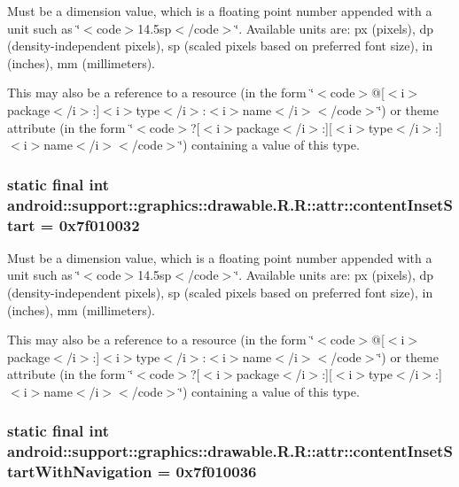 Must be a dimension value, which is a floating point number appended with a unit such as \char`\"{}$<$code$>$14.5sp$<$/code$>$\char`\"{}. Available units are: px (pixels), dp (density-independent pixels), sp (scaled pixels based on preferred font size), in (inches), mm (millimeters). 

This may also be a reference to a resource (in the form \char`\"{}$<$code$>$@\mbox{[}$<$i$>$package$<$/i$>$:\mbox{]}$<$i$>$type$<$/i$>$:$<$i$>$name$<$/i$>$$<$/code$>$\char`\"{}) or theme attribute (in the form \char`\"{}$<$code$>$?\mbox{[}$<$i$>$package$<$/i$>$:\mbox{]}\mbox{[}$<$i$>$type$<$/i$>$:\mbox{]}$<$i$>$name$<$/i$>$$<$/code$>$\char`\"{}) containing a value of this type. \hypertarget{classandroid_1_1support_1_1graphics_1_1drawable_1_1_r_1_1attr_f1266f3eec1e1a2c74543bb9c3bcfa59}{
\subsubsection[{contentInsetStart}]{\setlength{\rightskip}{0pt plus 5cm}static final int android::support::graphics::drawable.R.R::attr::contentInsetStart = 0x7f010032}}
\label{classandroid_1_1support_1_1graphics_1_1drawable_1_1_r_1_1attr_f1266f3eec1e1a2c74543bb9c3bcfa59}


Must be a dimension value, which is a floating point number appended with a unit such as \char`\"{}$<$code$>$14.5sp$<$/code$>$\char`\"{}. Available units are: px (pixels), dp (density-independent pixels), sp (scaled pixels based on preferred font size), in (inches), mm (millimeters). 

This may also be a reference to a resource (in the form \char`\"{}$<$code$>$@\mbox{[}$<$i$>$package$<$/i$>$:\mbox{]}$<$i$>$type$<$/i$>$:$<$i$>$name$<$/i$>$$<$/code$>$\char`\"{}) or theme attribute (in the form \char`\"{}$<$code$>$?\mbox{[}$<$i$>$package$<$/i$>$:\mbox{]}\mbox{[}$<$i$>$type$<$/i$>$:\mbox{]}$<$i$>$name$<$/i$>$$<$/code$>$\char`\"{}) containing a value of this type. \hypertarget{classandroid_1_1support_1_1graphics_1_1drawable_1_1_r_1_1attr_c16ae7d4468d0838176d7559c62c8bb5}{
\subsubsection[{contentInsetStartWithNavigation}]{\setlength{\rightskip}{0pt plus 5cm}static final int android::support::graphics::drawable.R.R::attr::contentInsetStartWithNavigation = 0x7f010036}}
\label{classandroid_1_1support_1_1graphics_1_1drawable_1_1_r_1_1attr_c16ae7d4468d0838176d7559c62c8bb5}


